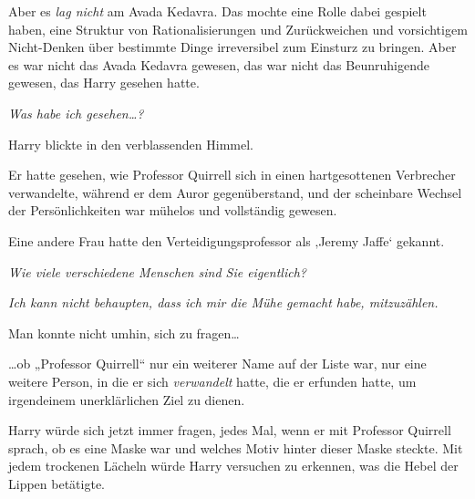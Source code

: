 Aber es \emph{lag nicht} am Avada Kedavra. Das mochte eine Rolle dabei gespielt haben, eine Struktur von Rationalisierungen und Zurückweichen und vorsichtigem Nicht-Denken über bestimmte Dinge irreversibel zum Einsturz zu bringen. Aber es war nicht das Avada Kedavra gewesen, das war nicht das Beunruhigende gewesen, das Harry gesehen hatte.

\emph{Was habe ich gesehen…?}

Harry blickte in den verblassenden Himmel.

Er hatte gesehen, wie Professor Quirrell sich in einen hartgesottenen Verbrecher verwandelte, während er dem Auror gegenüberstand, und der scheinbare Wechsel der Persönlichkeiten war mühelos und vollständig gewesen.

Eine andere Frau hatte den Verteidigungsprofessor als ‚Jeremy Jaffe‘ gekannt.

\emph{Wie viele verschiedene Menschen sind Sie eigentlich?}

\emph{Ich kann nicht behaupten, dass ich mir die Mühe gemacht habe, mitzuzählen.}

Man konnte nicht umhin, sich zu fragen…

…ob „Professor Quirrell“ nur ein weiterer Name auf der Liste war, nur eine weitere Person, in die er sich \emph{verwandelt} hatte, die er erfunden hatte, um irgendeinem unerklärlichen Ziel zu dienen.

Harry würde sich jetzt immer fragen, jedes Mal, wenn er mit Professor Quirrell sprach, ob es eine Maske war und welches Motiv hinter dieser Maske steckte. Mit jedem trockenen Lächeln würde Harry versuchen zu erkennen, was die Hebel der Lippen betätigte.


